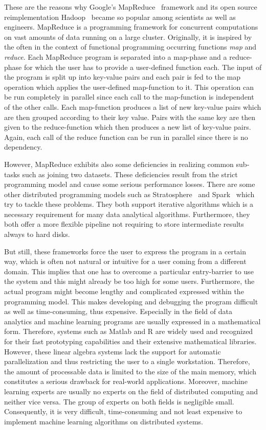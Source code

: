 \documentclass{dima}
\begin{document}
 These are the reasons why Google's MapReduce~\cite{dean:c2008a} framework and its open source reimplementation Hadoop~\cite{hadoop:2008a} became so popular among scientists as well as engineers.
 MapReduce is a programming framework for concurrent computations on vast amounts of data running on a large cluster. 
 Originally, it is inspired by the often in the context of functional programming occurring functions \emph{map} and \emph{reduce}.
 Each MapReduce program is separated into a map-phase and a reduce-phase for which the user has to provide a user-defined function each.
 The input of the program is split up into key-value pairs and each pair is fed to the map operation which applies the user-defined map-function to it.
 This operation can be run completely in parallel since each call to the map-function is independent of the other calls.
 Each map-function produces a list of new key-value pairs which are then grouped according to their key value.
 Pairs with the same key are then given to the reduce-function which then produces a new list of key-value pairs.
 Again, each call of the reduce function can be run in parallel since there is no dependency.

 However, MapReduce exhibits also some deficiencies in realizing common sub-tasks such as joining two datasets.
 These deficiencies result from the strict programming model and cause some serious performance losses.
 There are some other distributed programming models such as Stratosphere~\cite{battre:2010a} and Spark~\cite{zaharia:2010a} which try to tackle these problems.
 They both support iterative algorithms which is a necessary requirement for many data analytical algorithms.
 Furthermore, they both offer a more flexible pipeline not requiring to store intermediate results always to hard disks.

 But still, these frameworks force the user to express the program in a certain way, which is often not natural or intuitive for a user coming from a different domain.
 This implies that one has to overcome a particular entry-barrier to use the system and this might already be too high for some users.
 Furthermore, the actual program might become lengthy and complicated expressed within the programming model.
 This makes developing and debugging the program difficult as well as time-consuming, thus expensive.
 Especially in the field of data analytics and machine learning programs are usually expressed in a mathematical form.
 Therefore, systems such as Matlab and R are widely used and recognized for their fast prototyping capabilities and their extensive mathematical libraries.
 However, these linear algebra systems lack the support for automatic parallelization and thus restricting the user to a single workstation.
 Therefore, the amount of processable data is limited to the size of the main memory, which constitutes a serious drawback for real-world applications.
 Moreover, machine learning experts are usually no experts on the field of distributed computing and neither vice versa.
 The group of experts on both fields is negligible small.
 Consequently, it is very difficult, time-consuming and not least expensive to implement machine learning algorithms on distributed systems.
\end{document}

